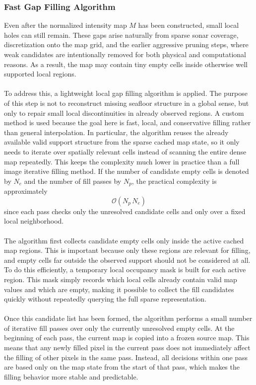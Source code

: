 \subsubsection{Fast Gap Filling Algorithm}
Even after the normalized intensity map $M$ has been constructed, small local holes can still remain. These gaps arise naturally from sparse sonar coverage, discretization onto the map grid, and the earlier aggressive pruning steps, where weak candidates are intentionally removed for both physical and computational reasons. As a result, the map may contain tiny empty cells inside otherwise well supported local regions.
\\ \\
To address this, a lightweight local gap filling algorithm is applied. The purpose of this step is not to reconstruct missing seafloor structure in a global sense, but only to repair small local discontinuities in already observed regions. A custom method is used because the goal here is fast, local, and conservative filling rather than general interpolation. In particular, the algorithm reuses the already available valid support structure from the sparse cached map state, so it only needs to iterate over spatially relevant cells instead of scanning the entire dense map repeatedly. This keeps the complexity much lower in practice than a full image iterative filling method. If the number of candidate empty cells is denoted by $N_e$ and the number of fill passes by $N_p$, the practical complexity is approximately
$$
    \mathcal{O}(N_p\,N_e)
$$
since each pass checks only the unresolved candidate cells and only over a fixed local neighborhood.
\\ \\
The algorithm first collects candidate empty cells only inside the active cached map regions. This is important because only these regions are relevant for filling, and empty cells far outside the observed support should not be considered at all. To do this efficiently, a temporary local occupancy mask is built for each active region. This mask simply records which local cells already contain valid map values and which are empty, making it possible to collect the fill candidates quickly without repeatedly querying the full sparse representation.
\\ \\
Once this candidate list has been formed, the algorithm performs a small number of iterative fill passes over only the currently unresolved empty cells. At the beginning of each pass, the current map is copied into a frozen source map. This means that any newly filled pixel in the current pass does not immediately affect the filling of other pixels in the same pass. Instead, all decisions within one pass are based only on the map state from the start of that pass, which makes the filling behavior more stable and predictable.
